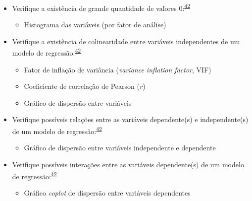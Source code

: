 \documentclass[
]{book}
\providecommand{\tightlist}{%
  \setlength{\itemsep}{0pt}\setlength{\parskip}{0pt}}
\begin{document}
\begin{itemize}
\item
  Verifique a existência de grande quantidade de valores 0:\textsuperscript{\protect\hyperlink{ref-zuur2009}{42}}

  \begin{itemize}
  \tightlist
  \item
    Histograma das variáveis (por fator de análise)
  \end{itemize}
\end{itemize}

\begin{itemize}
\item
  Verifique a existência de colinearidade entre variáveis independentes de um modelo de regressão:\textsuperscript{\protect\hyperlink{ref-zuur2009}{42}}

  \begin{itemize}
  \item
    Fator de inflação de variância (\emph{variance inflation factor}, VIF)
  \item
    Coeficiente de correlação de Pearson (\(r\))
  \item
    Gráfico de dispersão entre variáveis
  \end{itemize}
\end{itemize}

\begin{itemize}
\item
  Verifique possíveis relações entre as variáveis dependente(s) e independente(s) de um modelo de regressão:\textsuperscript{\protect\hyperlink{ref-zuur2009}{42}}

  \begin{itemize}
  \tightlist
  \item
    Gráfico de dispersão entre variáveis independente e dependente
  \end{itemize}
\end{itemize}

\begin{itemize}
\item
  Verifique possíveis interações entre as variáveis dependente(s) de um modelo de regressão:\textsuperscript{\protect\hyperlink{ref-zuur2009}{42}}

  \begin{itemize}
  \tightlist
  \item
    Gráfico \emph{coplot} de dispersão entre variáveis dependentes
  \end{itemize}
\end{itemize}
\end{document}
